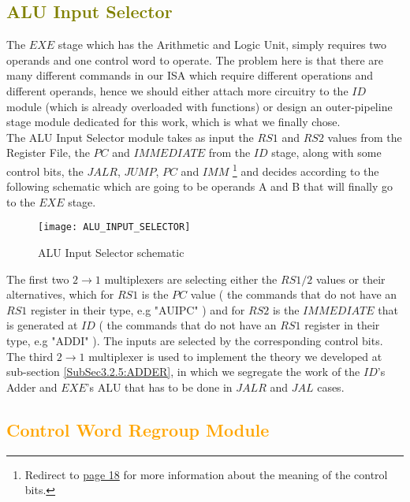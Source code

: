 \subsection{\textcolor{olive}{ALU Input Selector}}
\label{SubSec3.6.1:ALUIN}

The $EXE$ stage which has the Arithmetic and Logic Unit, simply requires two operands and one control word to operate. The problem here is that there are many different commands in our ISA which require different operations and different operands, hence we should either attach more circuitry to the $ID$ module (which is already overloaded with functions) or design an outer-pipeline stage module dedicated for this work, which is what we finally chose. \\

The ALU Input Selector module takes as input the $RS1$ and $RS2$ values from the Register File, the $PC$ and $IMMEDIATE$ from the $ID$ stage, along with some control bits, the $JALR$, $JUMP$, $PC$ and $IMM$ \footnote{Redirect to \hyperlink{page.18}{page 18} for more information about the meaning of the control bits.} and decides according to the following schematic which are going to be operands A and B that will finally go to the $EXE$ stage.
 
\begin{figure}[h!]
	\begin{center}
		\texttt{[image: ALU\_INPUT\_SELECTOR]}
		\caption{ALU Input Selector schematic}
		\label{Image3.15}
	\end{center}
\end{figure}

The first two $2\rightarrow1$ multiplexers are selecting either the $RS1/2$ values or their alternatives, which for $RS1$ is the $PC$ value ( the commands that do not have an $RS1$ register in their type, e.g "AUIPC" ) and for $RS2$ is the $IMMEDIATE$ that is generated at $ID$ ( the commands that do not have an $RS1$ register in their type, e.g "ADDI" ). The inputs are selected by the corresponding control bits. The third $2\rightarrow1$ multiplexer is used to implement the theory we developed at sub-section \ref{SubSec3.2.5:ADDER}, in which we segregate the work of the $ID$'s Adder and $EXE$'s ALU that has to be done in $JALR$ and $JAL$ cases.
\clearpage

\subsection{\textcolor{orange}{Control Word Regroup Module}}
\label{SubSec3.6.2:CTRLWRDRGRP}	

